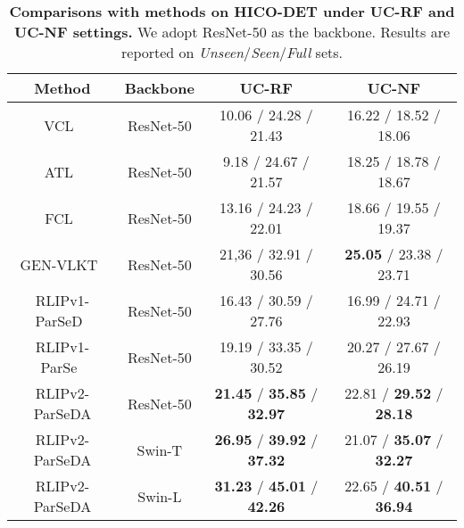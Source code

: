 {\renewcommand{\arraystretch}{0.9}
\begin{table}[t]
\scriptsize
  \setlength{\tabcolsep}{4pt}
  \centering
    \begin{tabular}{c|c|c|c}
    \toprule
    \textbf{Method} & \textbf{Backbone} & \textbf{UC-RF} & \textbf{UC-NF} \\
    \midrule
    \midrule
    VCL~\cite{hou2020VCL} & ResNet-50 & 10.06 / 24.28 / 21.43 & 16.22 / 18.52 / 18.06 \\
    ATL~\cite{hou2021ATL} & ResNet-50 & 9.18 / 24.67 / 21.57 & 18.25 / 18.78 / 18.67 \\
    FCL~\cite{hou2021FCL} & ResNet-50 & 13.16 / 24.23 / 22.01 & 18.66 / 19.55 / 19.37 \\
    GEN-VLKT~\cite{GEN_VLKT} & ResNet-50 & 21,36 / 32.91 / 30.56 & \textbf{25.05} / 23.38 / 23.71 \\
    RLIPv1-ParSeD~\cite{Yuan2022RLIP} &  ResNet-50 & 16.43 / 30.59 / 27.76 &  16.99 / 24.71 / 22.93 \\
    RLIPv1-ParSe~\cite{Yuan2022RLIP} & ResNet-50 & 19.19 / 33.35 / 30.52 & 20.27 / 27.67 / 26.19 \\
    \midrule
RLIPv2-ParSeDA & ResNet-50 & \textbf{21.45} / \textbf{35.85} / \textbf{32.97} & 22.81 / \textbf{29.52} / \textbf{28.18} \\
    RLIPv2-ParSeDA & Swin-T & \textbf{26.95} / \textbf{39.92} / \textbf{37.32} & 21.07 / \textbf{35.07} / \textbf{32.27} \\
    RLIPv2-ParSeDA & Swin-L & \textbf{31.23} / \textbf{45.01} / \textbf{42.26} & 22.65 / \textbf{40.51} / \textbf{36.94} \\
    \bottomrule
    \end{tabular}
    \vspace{-.1cm}
    \caption{\small \textbf{Comparisons with methods on HICO-DET under UC-RF and UC-NF settings.} We adopt ResNet-50 as the backbone. Results are reported on \textit{Unseen}/\textit{Seen}/\textit{Full} sets.}
    \vspace{-.2cm}
  \label{tab:zero-shot_UC-NF_UC-RF}
\end{table}}

